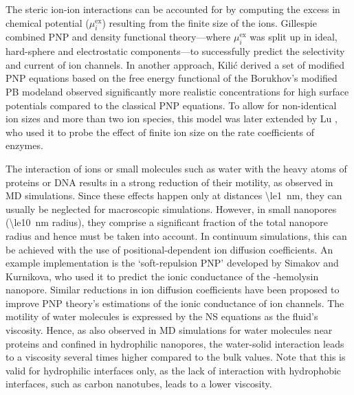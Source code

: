 \documentclass[journal=ancac3,manuscript=article,etalmode=truncate,maxauthors=0,layout=onecolumn]{achemso}
\begin{document}
The steric ion-ion interactions can be accounted for by computing the excess in chemical potential
($\mu_{i}^\text{ex}$) resulting from the finite size of the ions.\cite{Eisenberg-1996,Bazant-2009,
Daiguji-2010} Gillespie \etal{} combined PNP and density functional theory---where $\mu_{i}^\text{ex}$ was
split up in ideal, hard-sphere and electrostatic components---to successfully predict the selectivity and
current of ion channels.\cite{Gillespie-2002} In another approach, Kili\'{c} \etal{} derived a set of modified
PNP equations based on the free energy functional of the Borukhov's modified PB model\cite{Borukhov-1997}and
observed significantly more realistic concentrations for high surface potentials compared to the classical PNP
equations.\cite{Kilic-2007} To allow for non-identical ion sizes and more than two ion species, this model was
later extended by Lu \etal{}, who used it to probe the effect of finite ion size on the rate coefficients of
enzymes.\cite{Lu-2011}

The interaction of ions or small molecules such as water with the heavy atoms of proteins or DNA results in a
strong reduction of their motility, as observed in MD simulations.\cite{Makarov-1998,Pronk-2014,Wilson-2019}
Since these effects happen only at distances \SI{\le1}{\nm}, they can usually be neglected for macroscopic
simulations. However, in small nanopores (\SI{\le10}{\nm} radius), they comprise a significant fraction of the
total nanopore radius and hence must be taken into
account.\cite{Noskov-2004,Simakov-2010,Pederson-2015,McMullen-2017} In continuum simulations, this can be
achieved with the use of positional-dependent ion diffusion coefficients. An example implementation is the
`soft-repulsion PNP' developed by Simakov and Kurnikova,\cite{Simakov-2010,Simakov-2018} who used it to
predict the ionic conductance of the \textalpha-hemolysin nanopore. Similar reductions in ion diffusion
coefficients have been proposed to improve PNP theory's estimations of the ionic conductance of ion
channels.\cite{Furini-2006,Liu-2015,DeBiase-2015} The motility of water molecules is expressed by the NS
equations as the fluid's viscosity. Hence, as also observed in MD simulations for water molecules near
proteins\cite{Pronk-2014} and confined in hydrophilic nanopores,\cite{Qiao-Aluru-2003,Vo-2016,Hsu-2017} the
water-solid interaction leads to a viscosity several times higher compared to the bulk values. Note that this
is valid for hydrophilic interfaces only, as the lack of interaction with hydrophobic interfaces, such as
carbon nanotubes, leads to a lower viscosity.\cite{Ye-2011}
\end{document}
